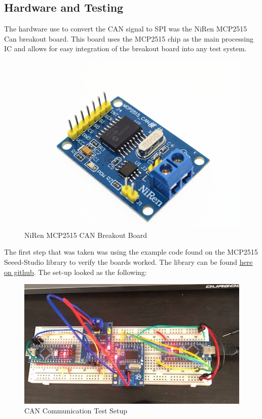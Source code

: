 \documentclass{article}
\begin{document}
\subsection{Hardware and Testing}
The hardware use to convert the CAN signal to SPI was the NiRen MCP2515 Can breakout board. This board uses the MCP2515 chip as the main processing IC and allows for easy integration of the breakout board into any test system.
\begin{figure}[H]
\centering
\includegraphics[scale=0.15]{NiRen.jpg}
\caption{NiRen MCP2515 CAN Breakout Board}
\label{fig:NiRen}
\end{figure}

The first step that was taken was using the example code found on the MCP2515 Seeed-Studio library to verify the boards worked. The library can be found \href{https://github.com/Seeed-Studio/CAN_BUS_Shield}{\underline{here on github}}. The set-up looked as the following:
\begin{figure}[H]
\centering
\includegraphics[scale=0.7]{CAN_Test.jpg}
\caption{CAN Communication Test Setup}
\label{fig:NiRen}
\end{figure}
\end{document}
